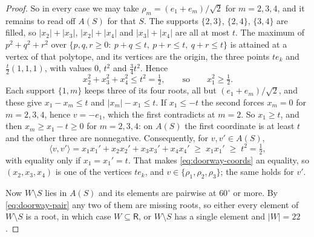 \documentclass[10pt,a4paper]{amsart}
\newcommand{\Rt}{\mathsf{R}}                 %
\begin{document}
\begin{proof}
So in every case we may take $\rho_m=(e_1+e_m)/\sqrt2$ for $m=2,3,4$, and
it remains to read off $A(S)$ for that $S$. The supports $\{2,3\}$,
$\{2,4\}$, $\{3,4\}$ are filled, so $|x_2|+|x_3|$, $|x_2|+|x_4|$ and
$|x_3|+|x_4|$ are all at most $t$. The maximum of $p^2+q^2+r^2$ over
$\{p,q,r\ge0:\ p+q\le t,\ p+r\le t,\ q+r\le t\}$ is attained at a vertex
of that polytope, and its vertices are the origin, the three points
$te_k$ and $\tfrac t2(1,1,1)$, with values $0$, $t^2$ and $\tfrac34t^2$.
Hence
\begin{equation}\label{eq:doorway-coords}
  x_2^2+x_3^2+x_4^2\le t^2=\tfrac12,
  \qquad\text{so}\qquad
  x_1^2\ge\tfrac12 .
\end{equation}
Each support $\{1,m\}$ keeps three of its four roots, all but
$(e_1+e_m)/\sqrt2$, and these give $x_1-x_m\le t$ and $|x_m|-x_1\le t$.
If $x_1\le-t$ the second forces $x_m=0$ for $m=2,3,4$, hence $v=-e_1$,
which the first contradicts at $m=2$. So $x_1\ge t$, and then
$x_m\ge x_1-t\ge0$ for $m=2,3,4$: on $A(S)$ the first coordinate is at
least $t$ and the other three are nonnegative. Consequently, for
$v,v'\in A(S)$,
\begin{equation}\label{eq:doorway-pair}
  \langle v,v'\rangle=x_1x_1'+x_2x_2'+x_3x_3'+x_4x_4'
  \;\ge\;x_1x_1'\;\ge\;t^2=\tfrac12 ,
\end{equation}
with equality only if $x_1=x_1'=t$. That makes
\eqref{eq:doorway-coords} an equality, so $(x_2,x_3,x_4)$ is one of the
vertices $te_k$, and $v\in\{\rho_1,\rho_2,\rho_3\}$; the same holds for
$v'$.

Now $W\setminus S$ lies in $A(S)$ and its elements are pairwise at
$60^\circ$ or more. By \eqref{eq:doorway-pair} any two of them are
missing roots, so either every element of $W\setminus S$ is a root, in
which case $W\subseteq\Rt$, or $W\setminus S$ has a single element and
$|W|=22$.
\end{proof}
\end{document}
